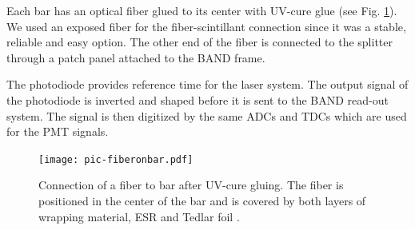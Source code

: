 \documentclass[3p,final,twocolumn]{elsarticle}
\begin{document}
Each bar has an optical fiber glued to its center with UV-cure glue (see
Fig. \ref{fig:pic-fiberonbar}). We used an exposed fiber for the fiber-scintillant connection since it was a stable, reliable and easy option. The other end of the fiber is connected to the splitter through a patch panel attached to the BAND frame. 

The photodiode provides reference time for the laser system. The output
signal of the photodiode is inverted and shaped before it is sent to
the BAND read-out system. The signal is then digitized by the same ADCs and
TDCs which are used for the PMT signals.

\begin{figure}[tb]
	\centering
		\texttt{[image: pic-fiberonbar.pdf]}
	\caption{Connection of a fiber to bar after UV-cure gluing. The fiber is positioned in the center of the bar and is covered by both layers of wrapping material, ESR \cite{3MESR} and Tedlar foil \cite{tedlarfoil}.}
	\label{fig:pic-fiberonbar}
\end{figure}



\end{document}
